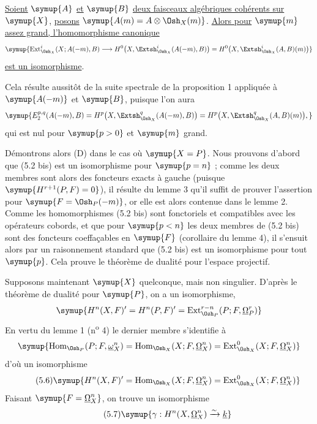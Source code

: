  \uline{Soient} $\symup{A}$ \uline{et} $\symup{B}$ \uline{deux faisceaux algébriques cohérents sur}
$\symup{X}$, \uline{posons} $\symup{A(m)=A\otimes\Osh_X(m)}$. \uline{Alors pour} $\symup{m}$ \uline{assez grand,
l'homomorphisme canonique}
\[
  \symup{\operatorname{Ext}_{\Osh_X}^{i}(X;A(-m),B)
  \longrightarrow H^{0}\bigl(X,\Extsh_{\Osh_X}^{i}(A(-m),B)\bigr)
  =H^{0}\bigl(X,\Extsh_{\Osh_X}^{i}(A,B)(m)\bigr)}
\]
\uline{est un isomorphisme}.

Cela résulte aussitôt de la suite spectrale de la proposition 1 appliquée à
$\symup{A(-m)}$ et $\symup{B}$, puisque l'on aura
\[
  \symup{E_{2}^{p,q}(A(-m),B)
  =H^{p}\bigl(X,\Extsh_{\Osh_X}^{q}(A(-m),B)\bigr)
  =H^{p}\bigl(X,\Extsh_{\Osh_X}^{q}(A,B)(m)\bigr),}
\]
qui est nul pour $\symup{p>0}$ et $\symup{m}$ grand.

Démontrons alors (D) dans le cas où $\symup{X=P}$. Nous prouvons d'abord que (5.2 bis)
est un isomorphisme pour $\symup{p=n}$ ; comme les deux membres sont alors des
foncteurs exacts à gauche (puisque $\symup{H^{r+1}(P,F)=0}$), il résulte du lemme 3
qu'il suffit de prouver l'assertion pour $\symup{F=\Osh_P(-m)}$, or elle est alors
contenue dans le lemme 2. Comme les homomorphismes (5.2 bis) sont fonctoriels et
compatibles avec les opérateurs cobords, et que pour $\symup{p<n}$ les deux membres de
(5.2 bis) sont des foncteurs coeffaçables en $\symup{F}$ (corollaire du lemme 4), il
s'ensuit alors par un raisonnement standard que (5.2 bis) est un isomorphisme
pour tout $\symup{p}$. Cela prouve le théorème de dualité pour l'espace projectif.

Supposons maintenant $\symup{X}$ quelconque, mais non singulier. D'après le théorème de
dualité pour $\symup{P}$, on a un isomorphisme,
\[
  \symup{H^{n}(X,F)'=H^{n}(P,F)'
  =\operatorname{Ext}_{\Osh_P}^{r-n}(P;F,\underline{\Omega}_P^{r})}
\]
En vertu du lemme 1 (n\textsuperscript{o} 4) le dernier membre s'identifie à
\[
  \symup{\operatorname{Hom}_{\Osh_P}(P;F,\underline{\omega}_X^{n})
  =\operatorname{Hom}_{\Osh_X}(X;F,\underline{\Omega}_X^{n})
  =\operatorname{Ext}_{\Osh_X}^{0}(X;F,\underline{\Omega}_X^{n})}
\]
d'où un isomorphisme
\begin{equation}\tag{5.6}
  \symup{H^{n}(X,F)'=\operatorname{Hom}_{\Osh_X}(X;F,\underline{\Omega}_X^{n})
  =\operatorname{Ext}_{\Osh_X}^{0}(X;F,\underline{\Omega}_X^{n})}
\end{equation}
Faisant $\symup{F=\underline{\Omega}_X^{n}}$, on trouve un isomorphisme
\begin{equation}\tag{5.7}
  \symup{\gamma:H^{n}(X,\underline{\Omega}_X^{n})\xrightarrow{\sim}\underline{k}}
\end{equation}

